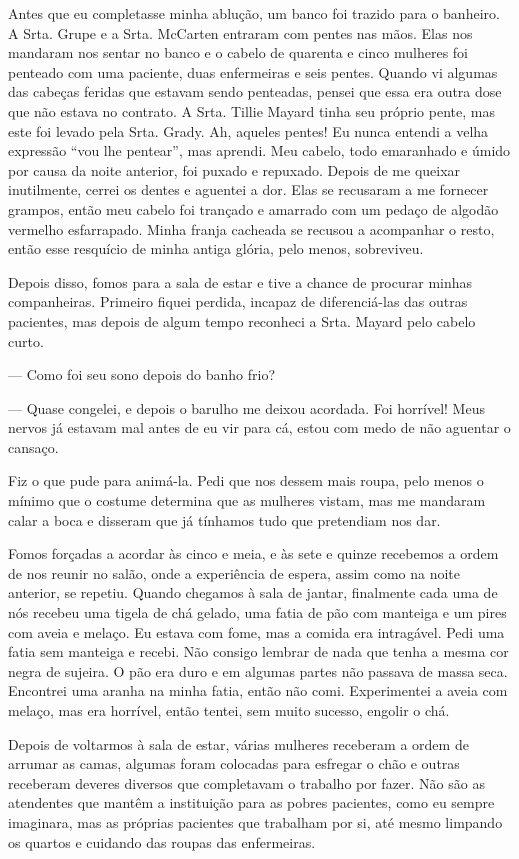 Antes que eu completasse minha ablução, um banco foi trazido para o
banheiro. A Srta. Grupe e a Srta. McCarten entraram com pentes nas mãos.
Elas nos mandaram nos sentar no banco e o cabelo de quarenta e cinco
mulheres foi penteado com uma paciente, duas enfermeiras e seis pentes.
Quando vi algumas das cabeças feridas que estavam sendo penteadas,
pensei que essa era outra dose que não estava no contrato. A Srta.
Tillie Mayard tinha seu próprio pente, mas este foi levado pela Srta.
Grady. Ah, aqueles pentes! Eu nunca entendi a velha expressão ``vou lhe
pentear'', mas aprendi. Meu cabelo, todo emaranhado e úmido por causa da
noite anterior, foi puxado e repuxado. Depois de me queixar inutilmente,
cerrei os dentes e aguentei a dor. Elas se recusaram a me fornecer
grampos, então meu cabelo foi trançado e amarrado com um pedaço de
algodão vermelho esfarrapado. Minha franja cacheada se recusou a
acompanhar o resto, então esse resquício de minha antiga glória, pelo
menos, sobreviveu.

Depois disso, fomos para a sala de estar e tive a chance de procurar
minhas companheiras. Primeiro fiquei perdida, incapaz de diferenciá-las
das outras pacientes, mas depois de algum tempo reconheci a Srta. Mayard
pelo cabelo curto.

--- Como foi seu sono depois do banho frio?

--- Quase congelei, e depois o barulho me deixou acordada. Foi horrível!
Meus nervos já estavam mal antes de eu vir para cá, estou com medo de
não aguentar o cansaço.

Fiz o que pude para animá-la. Pedi que nos dessem mais roupa, pelo menos
o mínimo que o costume determina que as mulheres vistam, mas me mandaram
calar a boca e disseram que já tínhamos tudo que pretendiam nos dar.

Fomos forçadas a acordar às cinco e meia, e às sete e quinze recebemos a
ordem de nos reunir no salão, onde a experiência de espera, assim como
na noite anterior, se repetiu. Quando chegamos à sala de jantar,
finalmente cada uma de nós recebeu uma tigela de chá gelado, uma fatia
de pão com manteiga e um pires com aveia e melaço. Eu estava com fome,
mas a comida era intragável. Pedi uma fatia sem manteiga e recebi. Não
consigo lembrar de nada que tenha a mesma cor negra de sujeira. O pão
era duro e em algumas partes não passava de massa seca. Encontrei uma
aranha na minha fatia, então não comi. Experimentei a aveia com melaço,
mas era horrível, então tentei, sem muito sucesso, engolir o chá.

Depois de voltarmos à sala de estar, várias mulheres receberam a ordem
de arrumar as camas, algumas foram colocadas para esfregar o chão e
outras receberam deveres diversos que completavam o trabalho por fazer.
Não são as atendentes que mantêm a instituição para as pobres pacientes,
como eu sempre imaginara, mas as próprias pacientes que trabalham por
si, até mesmo limpando os quartos e cuidando das roupas das enfermeiras.

